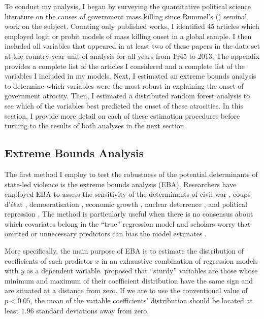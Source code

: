\documentclass[a4paper,12pt]{article}
\begin{document}
To conduct my analysis, I began by surveying the quantitative political science literature on the causes of government mass killing since Rummel's (\citeyear{rummel1995democracy}) seminal work on the subject. Counting only published works, I identified 45 articles which employed logit or probit models of mass killing onset in a global sample. I then included all variables that appeared in at least two of these papers in the data set at the country-year unit of analysis for all years from 1945 to 2013. The appendix provides a complete list of the articles I considered and a complete list of the variables I included in my models. Next, I estimated an extreme bounds analysis to determine which variables were the most robust in explaining the onset of government atrocity. Then, I estimated a distributed random forest analysis to see which of the variables best predicted the onset of these atrocities. In this section, I provide more detail on each of these estimation procedures before turning to the results of both analyses in the next section.

\subsection{Extreme Bounds Analysis}
\label{subsec:eba}

The first method I employ to test the robustness of the potential determinants of state-led violence is the extreme bounds analysis (EBA). Researchers have employed EBA to assess the sensitivity of the determinants of civil war \citep{hegre2006sensitivity}, coups d'état \citep{gassebner2016expect}, democratisation \citep{gassebner2013extreme}, economic growth \citep{levine1992sensitivity, sala1997just}, nuclear deterrence \citep{bell2015examining}, and political repression \citep{hafner2005right}. The method is particularly useful when there is no consensus about which covariates belong in the ``true'' regression model \citep[178]{sala1997just} and scholars worry that omitted or unnecessary predictors can bias the model estimates \citep[60]{angrist2008mostly, clarke2005phantom, elwert2014endogenous, spector2011methodological}.

More specifically, the main purpose of EBA is to estimate the distribution of coefficients of each predictor $x$ in an exhaustive combination of regression models with $y$ as a dependent variable. \cite[308]{leamer1985sensitivity} proposed that ``sturdy'' variables are those whose minimum and maximum of their coefficient distribution have the same sign and are situated at a distance from zero. If we are to use the conventional value of $p < 0.05$, the mean of the variable coefficients' distribution should be located at least $1.96$ standard deviations away from zero. 
	
\end{document}
